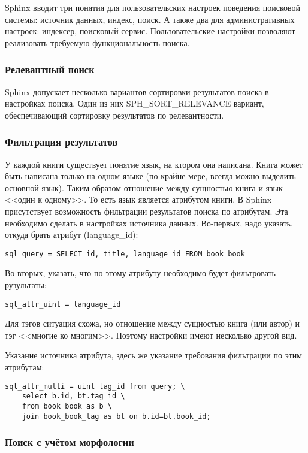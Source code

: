 Sphinx вводит три понятия для пользовательских настроек поведения поисковой системы: источник данных, индекс, поиск.
А также два для административных настроек: индексер, поисковый сервис.
Пользовательские настройки позволяют реализовать требуемую функциональность поиска.

\subsubsection{Релевантный поиск}

Sphinx допускает несколько вариантов сортировки результатов поиска в настройках поиска.
Один из них SPH\_SORT\_RELEVANCE вариант, обеспечивающий сортировку результатов по релевантности.

\subsubsection{Фильтрация результатов}

У каждой книги существует понятие язык, на ктором она написана.
Книга может быть написана только на одном языке (по крайне мере, всегда можно выделить основной язык).
Таким образом отношение между сущностью книга и язык <<один к одному>>.
То есть язык является атрибутом книги. В Sphinx присутствует возможность фильтрации результатов поиска по атрибутам.
Эта необходимо сделать в настройках источника данных. Во-первых, надо указать, откуда брать атрибут (language\_id):
\begin{verbatim}
sql_query = SELECT id, title, language_id FROM book_book
\end{verbatim}
Во-вторых, указать, что по этому атрибуту необходимо будет фильтровать рузультаты:
\begin{verbatim}
sql_attr_uint = language_id
\end{verbatim}

Для тэгов ситуация схожа, но отношение между сущностью книга (или автор) и тэг <<многие ко многим>>.
Поэтому настройки имеют несколько другой вид.

Указание источника атрибута, здесь же указание требования фильтрации по этим атрибутам:
\begin{verbatim}
sql_attr_multi = uint tag_id from query; \
	select b.id, bt.tag_id \
	from book_book as b \
	join book_book_tag as bt on b.id=bt.book_id;
\end{verbatim}


\subsubsection{Поиск с учётом морфологии}

